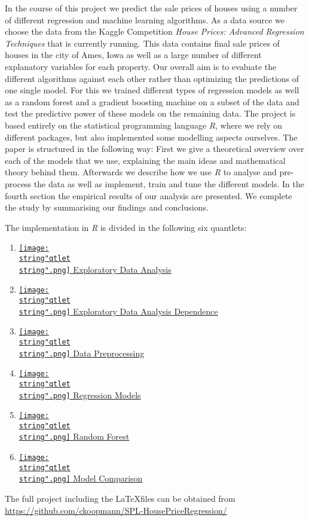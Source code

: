 In the course of this project we predict the sale prices of houses using a number of different regression and machine learning algorithms. As a data source we choose the data from the Kaggle Competition \textit{House Prices: Advanced Regression Techniques} that is currently running. This data contains final sale prices of houses in the city of Ames, Iowa as well as a large number of different explanatory variables for each property. Our overall aim is to evaluate the different algorithms against each other rather than optimizing the predictions of one single model. For this we trained different types of regression models as well as a random forest and a gradient boosting machine on a subset of the data and test the predictive power of these models on the remaining data. The project is based entirely on the statistical programming language \textit{R}, where we rely on different packages, but also implemented some modelling aspects ourselves. The paper is structured in the following way: First we give a theoretical overview over each of the models that we use, explaining the main ideas and mathematical theory behind them. Afterwards we describe how we use \textit{R} to  analyse and pre-process the data as well as implement, train and tune the different models. In the fourth section the empirical results of our analysis are presented. We complete the study by summarising our findings and conclusions. 


The implementation in \textit{R} is divided in the following six quantlets:
\begin{enumerate}
\item \href{https://github.com/ckoopmann/SPL-HousePriceRegression/tree/master/quantlets/Exploratory_Data_Analysis}{\texttt{[image: \\string"qtlet\\string".png]} Exploratory Data Analysis}
\item \href{https://github.com/ckoopmann/SPL-HousePriceRegression/tree/master/quantlets/Exploratory_Data_Analysis_Dependence}{\texttt{[image: \\string"qtlet\\string".png]} Exploratory Data Analysis Dependence}
\item \href{https://github.com/ckoopmann/SPL-HousePriceRegression/tree/master/quantlets/Data_Preprocessing}{\texttt{[image: \\string"qtlet\\string".png]} Data Preprocessing}
\item \href{https://github.com/ckoopmann/SPL-HousePriceRegression/tree/master/quantlets/Regression_Models}{\texttt{[image: \\string"qtlet\\string".png]} Regression Models}
\item \href{https://github.com/ckoopmann/SPL-HousePriceRegression/tree/master/quantlets/Random_Forest}{\texttt{[image: \\string"qtlet\\string".png]} Random Forest}
\item \href{https://github.com/ckoopmann/SPL-HousePriceRegression/tree/master/quantlets/Model_Comparison}{\texttt{[image: \\string"qtlet\\string".png]} Model Comparison}
\end{enumerate}
The full project including the \LaTeX files can be obtained from \href{https://github.com/ckoopmann/SPL-HousePriceRegression/}{https://github.com/ckoopmann/SPL-HousePriceRegression/}
